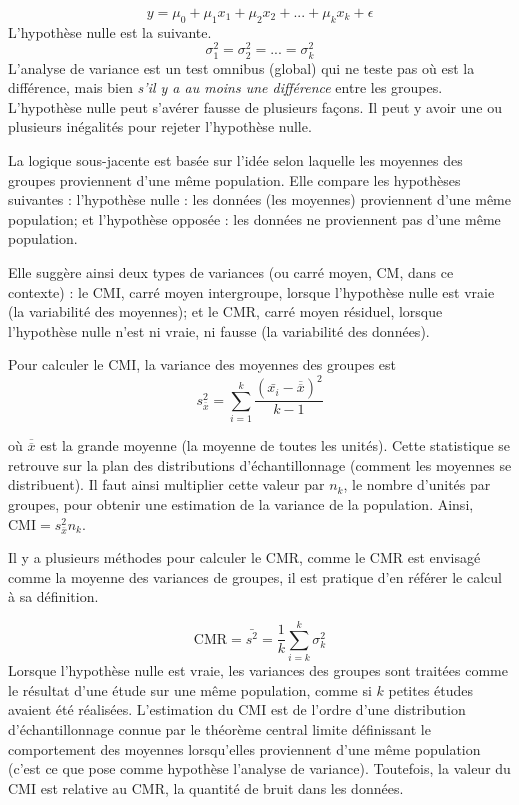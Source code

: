 \documentclass[
]{book}
\begin{document}
\[y = \mu_0 + \mu_1x_1 + \mu_2x_2+ ... +\mu_kx_k + \epsilon\]
L'hypothèse nulle est la suivante.
\[\sigma^2_1=\sigma^2_2=...=\sigma^2_k\]
L'analyse de variance est un test omnibus (global) qui ne teste pas où est la différence, mais bien \emph{s'il y a au moins une différence} entre les groupes. L'hypothèse nulle peut s'avérer fausse de plusieurs façons. Il peut y avoir une ou plusieurs inégalités pour rejeter l'hypothèse nulle.

La logique sous-jacente est basée sur l'idée selon laquelle les moyennes des groupes proviennent d'une même population. Elle compare les hypothèses suivantes : l'hypothèse nulle : les données (les moyennes) proviennent d'une même population; et l'hypothèse opposée : les données ne proviennent pas d'une même population.

Elle suggère ainsi deux types de variances (ou carré moyen, CM, dans ce contexte) : le CMI, carré moyen intergroupe, lorsque l'hypothèse nulle est vraie (la variabilité des moyennes); et le CMR, carré moyen résiduel, lorsque l'hypothèse nulle n'est ni vraie, ni fausse (la variabilité des données).

Pour calculer le CMI, la variance des moyennes des groupes est
\[s^2_{\bar{x}}=\sum_{i=1}^k\frac{(\bar{x_i}-\overline{\overline{x}})^2}{k-1}\]

où \(\overline{\overline{x}}\) est la grande moyenne (la moyenne de toutes les unités). Cette statistique se retrouve sur la plan des distributions d'échantillonnage (comment les moyennes se distribuent). Il faut ainsi multiplier cette valeur par \(n_k\), le nombre d'unités par groupes, pour obtenir une estimation de la variance de la population. Ainsi, \(\text{CMI} = s^2_{\bar{x}}n_k\).

Il y a plusieurs méthodes pour calculer le CMR, comme le CMR est envisagé comme la moyenne des variances de groupes, il est pratique d'en référer le calcul à sa définition.

\[
\text{CMR} = \bar{s^2} = \frac{1}{k}\sum_{i=k}^k\sigma_k^2 
\]
Lorsque l'hypothèse nulle est vraie, les variances des groupes sont traitées comme le résultat d'une étude sur une même population, comme si \(k\) petites études avaient été réalisées. L'estimation du CMI est de l'ordre d'une distribution d'échantillonnage connue par le théorème central limite définissant le comportement des moyennes lorsqu'elles proviennent d'une même population (c'est ce que pose comme hypothèse l'analyse de variance). Toutefois, la valeur du CMI est relative au CMR, la quantité de bruit dans les données.
\end{document}
